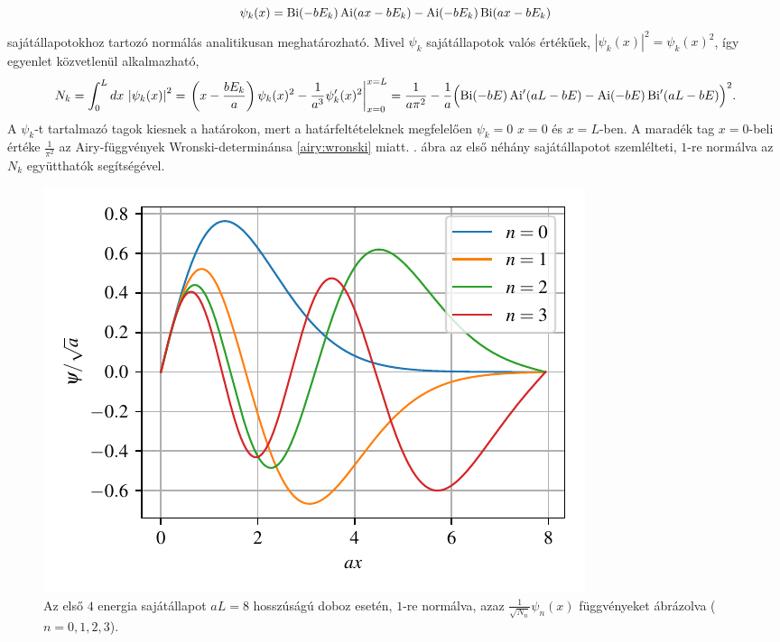 \begin{equation}
	\psi_k(x) = \operatorname{Bi}(-bE_k)\operatorname{Ai}(ax-bE_k) - \operatorname{Ai}(-bE_k)\operatorname{Bi}(ax-bE_k)
	\label{vegesf:psik}
\end{equation}
sajátállapotokhoz tartozó normálás analitikusan meghatározható. Mivel $\psi_k$ sajátállapotok valós értékűek, $\left|\psi_k(x)\right|^2 = \psi_k(x)^2$, így  egyenlet közvetlenül alkalmazható,
\begin{dmath}
	N_k = \int_0^Ldx\,\left|\psi_k(x)\right|^2 = \left.\left(x-\frac{bE_k}{a}\right)\psi_k(x)^2 - \frac{1}{a^3}\psi_k^\prime(x)^2\right|_{x=0}^{x=L} = \frac{1}{a\pi^2}-\frac{1}{a}\Bigl(\Bi(-bE)\Aip(aL-bE)-\Ai(-bE)\Bip(aL-bE)\Bigr)^2.
	\label{vegesf:nk}
\end{dmath}
A $\psi_k$-t tartalmazó tagok kiesnek a határokon, mert a határfeltételeknek megfelelően $\psi_k=0$ $x=0$ és $x=L$-ben. A maradék tag $x=0$-beli értéke $\frac{1}{\pi^2}$ az Airy-függvények Wronski-determinánsa \eqref{airy:wronski} miatt. . ábra az első néhány sajátállapotot szemlélteti,  $1$-re normálva az $N_k$ együtthatók segítségével.
\begin{figure}[H]
	\centering
	\includegraphics[scale=1]{./figs/allapotok.pdf}
	\caption[Sajátállapotok]{Az első $4$ energia sajátállapot $aL=8$ hosszúságú doboz esetén, $1$-re normálva, azaz $\frac{1}{\sqrt{N_n}}\psi_n(x)$ függvényeket ábrázolva ($n=0,1,2,3$).}
	\label{vegesf:eigenstates}
\end{figure}
	
